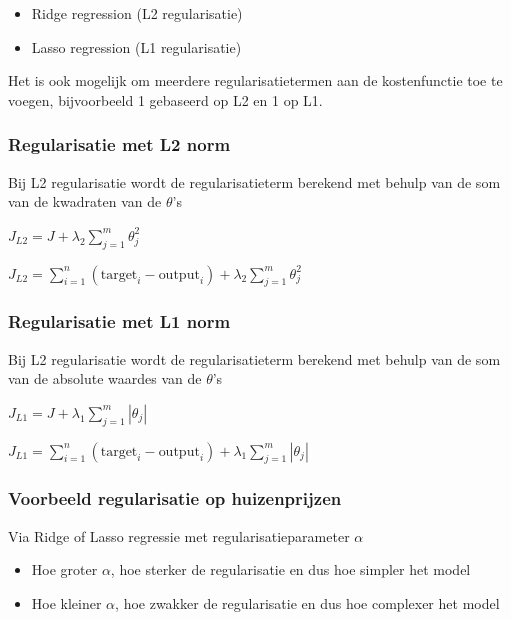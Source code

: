 \documentclass{article}
\begin{document}
\begin{itemize}
    \item Ridge regression (L2 regularisatie)
    \item Lasso regression (L1 regularisatie)
\end{itemize}

Het is ook mogelijk om meerdere regularisatietermen aan de kostenfunctie toe te voegen, 
bijvoorbeeld 1 gebaseerd op L2 en 1 op L1.

\subsubsection{Regularisatie met L2 norm}

Bij L2 regularisatie wordt de regularisatieterm berekend met behulp van de som 
van de kwadraten van de $\theta$'s 

\begin{center}
$J_{L2} = J + \lambda_2 \sum_{j=1}^m \theta_j^2$

$J_{L2} = \sum_{i=1}^n (\text{target}_i - \text{output}_i) + \lambda_2 \sum_{j=1}^m \theta_j^2$
\end{center}


\subsubsection{Regularisatie met L1 norm}

Bij L2 regularisatie wordt de regularisatieterm berekend met behulp van de som 
van de absolute waardes van de $\theta$'s 

\begin{center}
$J_{L1} = J + \lambda_1 \sum_{j=1}^m |\theta_j|$

$J_{L1} = \sum_{i=1}^n (\text{target}_i - \text{output}_i) + \lambda_1 \sum_{j=1}^m |\theta_j|$
\end{center}


\subsubsection{Voorbeeld regularisatie op huizenprijzen}

Via Ridge of Lasso regressie met regularisatieparameter $\alpha$

\begin{itemize}
    \item Hoe groter $\alpha$, hoe sterker de regularisatie en dus hoe simpler het model
    \item Hoe kleiner $\alpha$, hoe zwakker de regularisatie en dus hoe complexer het model
\end{itemize}
\end{document}
